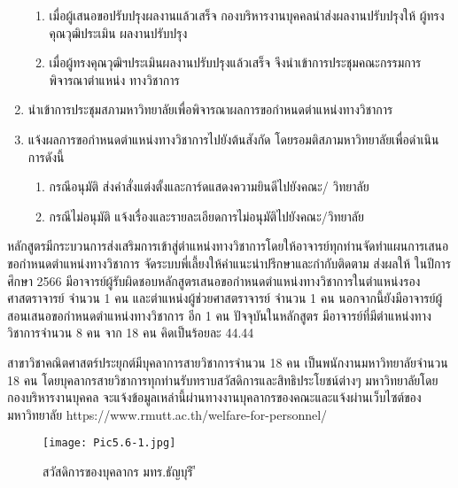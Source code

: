 \begin{enumerate}
\begin{enumerate}[label=9.\arabic*,leftmargin=0.7cm, labelsep=2mm]
\item เมื่อผู้เสนอขอปรับปรุงผลงานแล้วเสร็จ กองบริหารงานบุคคลนำส่งผลงานปรับปรุงให้
ผู้ทรงคุณวุฒิประเมิน ผลงานปรับปรุง
\item เมื่อผู้ทรงคุณวุฒิฯประเมินผลงานปรับปรุงแล้วเสร็จ จึงนำเข้าการประชุมคณะกรรมการ
พิจารณาตำแหน่ง ทางวิชาการ
\end{enumerate}
\item นำเข้าการประชุมสภามหาวิทยาลัยเพื่อพิจารณาผลการขอกำหนดตำแหน่งทางวิชาการ
\item แจ้งผลการขอกำหนดตำแหน่งทางวิชาการไปยังต้นสังกัด โดยรอมติสภามหาวิทยาลัยเพื่อดำเนินการดังนี้
\begin{enumerate}[label=11.\arabic*,leftmargin=0.8cm, labelsep=2mm]
\item กรณีอนุมัติ ส่งคำสั่งแต่งตั้งและการ์ดแสดงความยินดีไปยังคณะ/
วิทยาลัย
\item กรณีไม่อนุมัติ แจ้งเรื่องและรายละเอียดการไม่อนุมัติไปยังคณะ/วิทยาลัย
\end{enumerate}
\end{enumerate}

 หลักสูตรมีกระบวนการส่งเสริมการเข้าสู่ตำแหน่งทางวิชาการโดยให้อาจารย์ทุกท่านจัดทำแผนการเสนอขอกำหนดตำแหน่งทางวิชาการ จัดระบบพี่เลี้ยงให้คำแนะนำปรึกษาและกำกับติดตาม ส่งผลให้
ในปีการศึกษา 2566 มีอาจารย์ผู้รับผิดชอบหลักสูตรเสนอขอกำหนดตำแหน่งทางวิชาการในตำแหน่งรองศาสตราจารย์ จำนวน 1 คน และตำแหน่งผู้ช่วยศาสตราจารย์ จำนวน 1 คน 
นอกจากนี้ยังมีอาจารย์ผู้สอนเสนอขอกำหนดตำแหน่งทางวิชาการ อีก 1 คน ปัจจุบันในหลักสูตร
มีอาจารย์ที่มีตำแหน่งทางวิชาการจำนวน 8 คน จาก 18 คน คิดเป็นร้อยละ 44.44 
\begin{doclist}
\end{doclist}
สาขาวิชาคณิตศาสตร์ประยุกต์มีบุคลาการสายวิชาการจำนวน 18 คน เป็นพนักงานมหาวิทยาลัยจำนวน 18 คน  โดยบุคลากรสายวิชาการทุกท่านรับทราบสวัสดิการและสิทธิประโยชน์ต่างๆ มหาวิทยาลัยโดย กองบริหารงานบุคคล จะแจ้งข้อมูลเหล่านี้ผ่านทางงานบุคลากรของคณะและแจ้งผ่านเว็บไซต์ของมหาวิทยาลัย  https://www.rmutt.ac.th/welfare-for-personnel/ 
\begin{center}
\begin{figure}[h!]
	\texttt{[image: Pic5.6-1.jpg]}
	\caption{สวัสดิการของบุคลากร มทร.ธัญบุรี	ี}
	\label{Pic5.6-1}
\end{figure}
\end{center}

